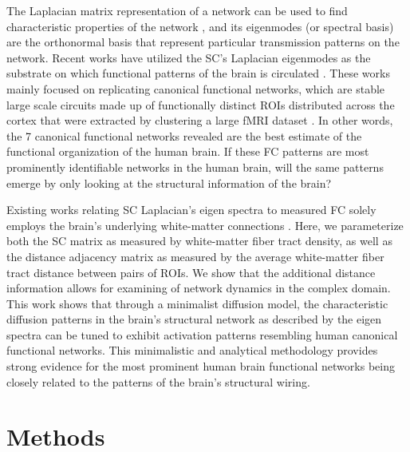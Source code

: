 \documentclass{article}
\begin{document}
The Laplacian matrix representation of a network can be used to find characteristic properties of the network \cite{Stewart1999}, and its eigenmodes (or spectral basis) are the orthonormal basis that represent particular transmission patterns on the network. Recent works have utilized the SC's Laplacian eigenmodes as the substrate on which functional patterns of the brain
is circulated \cite{Atasoy2016, preti_decoupling_2019}. These works mainly focused on replicating canonical functional networks, which are stable large scale circuits made up of functionally distinct ROIs distributed across the cortex that were extracted by clustering a large fMRI dataset \cite{Yeo2011}. In other words, the 7 canonical functional networks revealed are the best estimate of the functional organization of the human brain. If these FC patterns are most prominently identifiable networks in the human brain, will the same patterns emerge by only looking at the structural information of the brain?


Existing works relating SC Laplacian's eigen spectra to measured FC solely employs the brain's underlying white-matter connections \cite{Atasoy2016, preti_decoupling_2019}. Here, we parameterize both the SC matrix as measured by white-matter fiber tract density, as well as the distance adjacency matrix as measured by the average white-matter fiber tract distance between pairs of ROIs. We show that the additional distance information allows for examining of network dynamics in the complex domain. This work shows that through a minimalist diffusion model, the characteristic diffusion patterns in the brain's structural network as described by the eigen spectra can be tuned to exhibit activation patterns resembling human canonical functional networks. This minimalistic and analytical methodology provides strong evidence for the most prominent human brain functional networks being closely related to the patterns of the brain's structural wiring.


\section{Methods}
\label{sec:methods}
\end{document}
